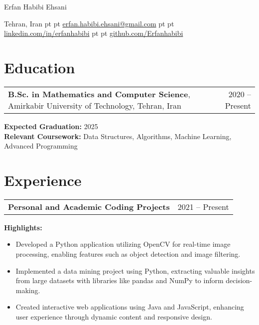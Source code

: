 \documentclass[10pt, a4paper]{article}
\newenvironment{header}{
    \centering
}{\par}
\begin{document}
    \begin{header}
        \fontsize{25 pt}{25 pt}\selectfont Erfan Habibi Ehsani

        \vspace{5 pt}

        \normalsize
        Tehran, Iran%
         pt%
        \textbar%
         pt%
        \href{mailto:erfan.habibi.ehsani@gmail.com}{erfan.habibi.ehsani@gmail.com}%
         pt%
        \textbar%
         pt%
        \href{https://www.linkedin.com/in/erfanhabibi/}{linkedin.com/in/erfanhabibi}%
         pt%
        \textbar%
         pt%
        \href{https://github.com/Erfanhabibi}{github.com/Erfanhabibi}%
    \end{header}

\vspace{10 pt}

\section{Education}

\begin{tabularx}{\textwidth}{Xr}
    \textbf{B.Sc. in Mathematics and Computer Science}, Amirkabir University of Technology, Tehran, Iran & 2020 -- Present \\
\end{tabularx}

\vspace{0.1 cm}

\textbf{Expected Graduation:} 2025 \\
\textbf{Relevant Coursework:} Data Structures, Algorithms, Machine Learning, Advanced Programming

\section{Experience}

\begin{tabularx}{\textwidth}{Xr}
    \textbf{Personal and Academic Coding Projects} & 2021 -- Present \\
\end{tabularx}

\vspace{0.1 cm}

\textbf{Highlights:}
\begin{itemize}
    \item Developed a Python application utilizing OpenCV for real-time image processing, enabling features such as object detection and image filtering.
    \item Implemented a data mining project using Python, extracting valuable insights from large datasets with libraries like pandas and NumPy to inform decision-making.
    \item Created interactive web applications using Java and JavaScript, enhancing user experience through dynamic content and responsive design.
\end{itemize}
\end{document}
